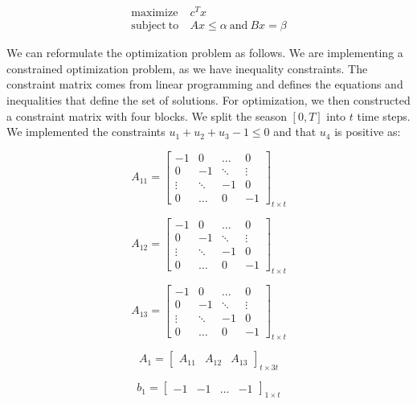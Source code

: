 \documentclass[12pt, oneside]{article}   	%
\begin{document}
\begin{align}
 \mathrm{maximize} & \  c^Tx \\
 \mathrm{subject \ to} & \  Ax \leq \alpha \ \mathrm{and} \ Bx = \beta 
\end{align}

\noindent We can reformulate the optimization problem as follows. We are implementing a constrained optimization problem, as we have inequality constraints.  The constraint matrix comes from linear programming and defines the equations and inequalities that define the set of solutions. For optimization, we then constructed a constraint matrix with four blocks. We split the season $ \left[ 0,T \right] $ into $t$ time steps. \\

\noindent We implemented the constraints $ u_1+u_2+u_3 - 1 \leq 0 $ and that $u_4$ is positive as:

\[ A_{11}=
  \begin{bmatrix}
    -1		& 0 	 	& \ldots 	& 0  	 \\
    0 	 	& -1  	& \ddots 	& \vdots  \\
    \vdots   & \ddots 	& -1		& 0  \\
    0 		& \ldots 	& 0 		& -1  
  \end{bmatrix}_{ t \times t}
 \]
 
\[
A_{12}=
  \begin{bmatrix}
    -1		& 0 	 	& \ldots 	& 0  	 \\
    0 	 	& -1  	& \ddots 	& \vdots  \\
    \vdots   & \ddots 	& -1		& 0  \\
    0 		& \ldots 	& 0 		& -1  
  \end{bmatrix}_{ t \times t}
\]

\[
A_{13}=
  \begin{bmatrix}
    -1		& 0 	 	& \ldots 	& 0  	 \\
    0 	 	& -1  	& \ddots 	& \vdots  \\
    \vdots   & \ddots 	& -1		& 0  \\
    0 		& \ldots 	& 0 		& -1  
  \end{bmatrix}_{ t \times t}
\]

\[
A_1=
  \begin{bmatrix}
   A_{11} & A_{12} & A_{13}
   \end{bmatrix}_{t \times 3t}
\]

\[
b_1=
  \begin{bmatrix}
    -1 & -1 & \dots & -1
  \end{bmatrix}_{ 1 \times t }
\]
\end{document}
